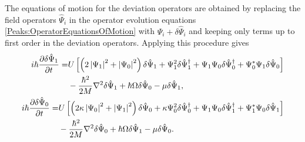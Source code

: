 The equations of motion for the deviation operators are obtained by replacing the field operators $\hat{\Psi}_i$ in the operator evolution equations \eqref{Peaks:OperatorEquationsOfMotion} with $\Psi_i + \delta \hat{\Psi}_i$ and keeping only terms up to first order in the deviation operators. Applying this procedure gives
\begin{subequations}
    \label{Peaks:DeviationOperatorsEvolutionXSpace}
    \begin{align}
        \begin{split}
            i \hbar \frac{\partial \delta \hat{\Psi}_1}{\partial t} =& U\left[ \left(2\abs{\Psi_1}^2+\abs{\Psi_0}^2 \right)\delta \hat{\Psi}_1 + \Psi_1^2\delta\hat{\Psi}_1^\dagger + \Psi_1\Psi_0\delta\hat{\Psi}_0^\dagger + \Psi_0^*\Psi_1\delta\hat{\Psi}_0\right]\\
                    & - \frac{\hbar^2}{2M}\nabla^2 \delta \hat{\Psi}_1 +\hbar \Omega\delta\hat{\Psi}_0- \mu \delta \hat{\Psi}_1,
        \end{split}\\
        \begin{split}
        i \hbar \frac{\partial \delta \hat{\Psi}_0}{\partial t} =& U\left[\left(2\kappa \abs{\Psi_0}^2 +\abs{\Psi_1}^2\right)\delta\hat{\Psi}_0 + \kappa \Psi_0^2 \delta\hat{\Psi}_0^\dagger + \Psi_1\Psi_0\delta\hat{\Psi}_1^\dagger + \Psi_1^*\Psi_0\delta\hat{\Psi}_1\right]\\
                    & -\frac{\hbar^2}{2M}\nabla^2 \delta \hat{\Psi}_0 +\hbar \Omega\delta\hat{\Psi}_1 - \mu \delta\hat{\Psi}_0.
        \end{split}
    \end{align}
\end{subequations}

